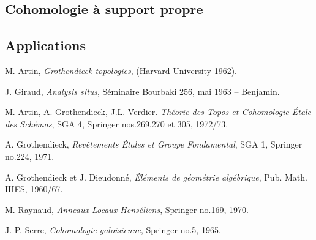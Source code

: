 \documentclass{article}
\begin{document}
\subsection{Cohomologie à support propre}\label{4-5}

\subsection{Applications}\label{4-6}










\begin{thebibliography}{ab}
   M. Artin, \emph{Grothendieck topologies}, (Harvard University 1962).

   J. Giraud, \emph{Analysis situs}, Séminaire Bourbaki 256, mai 1963 -- Benjamin. 

   M. Artin, A. Grothendieck, J.L. Verdier. \emph{Théorie des Topos et Cohomologie Étale des Schémas}, SGA 4, Springer nos.269,270 et 305, 1972/73.

   A. Grothendieck, \emph{Revêtements Étales et Groupe Fondamental}, SGA 1, Springer no.224, 1971.
  
   A. Grothendieck et J. Dieudonné, \emph{Éléments de géométrie algébrique}, Pub. Math. IHES, 1960/67. 

   M. Raynaud, \emph{Anneaux Locaux Henséliens}, Springer no.169, 1970. 

   J.-P. Serre, \emph{Cohomologie galoisienne}, Springer no.5, 1965.

\end{thebibliography}
\end{document}
